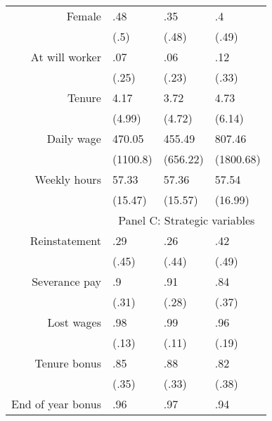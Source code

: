 \begin{tabular}{rrrr}
Female & \multicolumn{1}{l}{.48} & \multicolumn{1}{l}{.35} & \multicolumn{1}{l}{.4} \\
      & \multicolumn{1}{l}{(.5)} & \multicolumn{1}{l}{(.48)} & \multicolumn{1}{l}{(.49)} \\
At will worker & \multicolumn{1}{l}{.07} & \multicolumn{1}{l}{.06} & \multicolumn{1}{l}{.12} \\
      & \multicolumn{1}{l}{(.25)} & \multicolumn{1}{l}{(.23)} & \multicolumn{1}{l}{(.33)} \\
Tenure & \multicolumn{1}{l}{4.17} & \multicolumn{1}{l}{3.72} & \multicolumn{1}{l}{4.73} \\
      & \multicolumn{1}{l}{(4.99)} & \multicolumn{1}{l}{(4.72)} & \multicolumn{1}{l}{(6.14)} \\
Daily wage & \multicolumn{1}{l}{470.05} & \multicolumn{1}{l}{455.49} & \multicolumn{1}{l}{807.46} \\
      & \multicolumn{1}{l}{(1100.8)} & \multicolumn{1}{l}{(656.22)} & \multicolumn{1}{l}{(1800.68)} \\
Weekly hours & \multicolumn{1}{l}{57.33} & \multicolumn{1}{l}{57.36} & \multicolumn{1}{l}{57.54} \\
      & \multicolumn{1}{l}{(15.47)} & \multicolumn{1}{l}{(15.57)} & \multicolumn{1}{l}{(16.99)} \\
      \midrule
      & \multicolumn{3}{c}{Panel C: Strategic  variables} \\
      \midrule
      \midrule
Reinstatement & \multicolumn{1}{l}{.29} & \multicolumn{1}{l}{.26} & \multicolumn{1}{l}{.42} \\
      & \multicolumn{1}{l}{(.45)} & \multicolumn{1}{l}{(.44)} & \multicolumn{1}{l}{(.49)} \\
Severance pay & \multicolumn{1}{l}{.9} & \multicolumn{1}{l}{.91} & \multicolumn{1}{l}{.84} \\
      & \multicolumn{1}{l}{(.31)} & \multicolumn{1}{l}{(.28)} & \multicolumn{1}{l}{(.37)} \\
Lost wages & \multicolumn{1}{l}{.98} & \multicolumn{1}{l}{.99} & \multicolumn{1}{l}{.96} \\
      & \multicolumn{1}{l}{(.13)} & \multicolumn{1}{l}{(.11)} & \multicolumn{1}{l}{(.19)} \\
Tenure bonus & \multicolumn{1}{l}{.85} & \multicolumn{1}{l}{.88} & \multicolumn{1}{l}{.82} \\
      & \multicolumn{1}{l}{(.35)} & \multicolumn{1}{l}{(.33)} & \multicolumn{1}{l}{(.38)} \\
End of year bonus & \multicolumn{1}{l}{.96} & \multicolumn{1}{l}{.97} & \multicolumn{1}{l}{.94} \\

\end{tabular}
